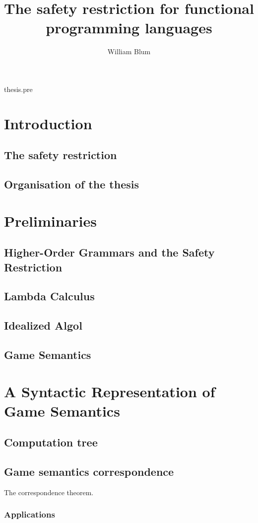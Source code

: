  {thesis.pre}

\title{The safety restriction for functional programming languages}
\author{William Blum}


  \tableofcontents

\chapter{Introduction}
    \section{The safety restriction}
    \section{Organisation of the thesis}

\chapter{Preliminaries}
    \section{Higher-Order Grammars and the Safety Restriction}
    \section{Lambda Calculus}
    \section{Idealized Algol}
    \section{Game Semantics}

\chapter{A Syntactic Representation of Game Semantics}
    \section{Computation tree}
    \section{Game semantics correspondence}
    The correspondence theorem.
    \subsection{Applications}



